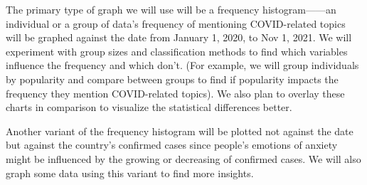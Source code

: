 \documentclass{article}
\begin{document}
    The primary type of graph we will use will be a frequency histogram——an individual or a group of data’s frequency of mentioning COVID-related topics will be graphed against the date from January 1, 2020, to Nov 1, 2021. We will experiment with group sizes and classification methods to find which variables influence the frequency and which don’t. (For example, we will group individuals by popularity and compare between groups to find if popularity impacts the frequency they mention COVID-related topics). We also plan to overlay these charts in comparison to visualize the statistical differences better.

    Another variant of the frequency histogram will be plotted not against the date but against the country’s confirmed cases since people’s emotions of anxiety might be influenced by the growing or decreasing of confirmed cases. We will also graph some data using this variant to find more insights.
\end{document}
